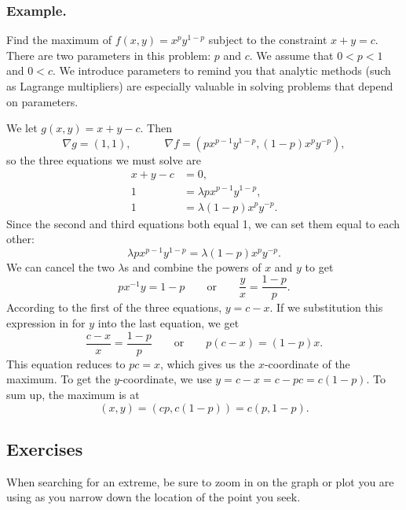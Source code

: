 \subsubsection{Example.}
Find the maximum of $f(x, y) = x^p y^{1-p}$ subject to
the constraint $x + y = c$.  There are two parameters in this problem:
$p$ and $c$.  We assume that $0 < p < 1$ and $0 < c$.  We introduce
parameters to remind you that analytic methods (such as Lagrange
multipliers) are especially valuable in solving problems that depend
on parameters.

We let $g(x, y) = x + y - c$.  Then
       \[
\nabla g = (1, 1), \qquad \quad \nabla f = 
                \left(p x^{p-1} y^{1-p}, (1-p) x^p y^{-p} \right),
\]
so the three equations we must solve are
\begin{align*}
x + y - c &= 0, \\
        1 &= \lambda p x^{p-1} y^{1-p}, \\
        1 &= \lambda (1-p) x^p y^{-p}.
\end{align*}
Since the second and third equations both equal 1, we can set them
equal to each other:
        \[
\lambda p x^{p-1} y^{1-p} = \lambda (1-p) x^p y^{-p}.
\]
We can cancel the two $\lambda$s and combine the powers of $x$ and $y$ to get
        \[
p x^{-1} y = 1 - p \qquad \mbox{or} \qquad 
                \dfrac{y}{x} = \dfrac{1 - p}{p}.
\]
According to the first of the three equations, $y = c - x$.  If we substitution this expression in for $y$ into the last equation, we get
        \[
\dfrac{c - x}{x} = \dfrac{1 - p}{p} \qquad \mbox{or} \qquad 
                p(c - x) = (1 - p) x.
\]
This equation reduces to $pc = x$, which gives us the $x$-coordinate of the maximum.  To get the $y$-coordinate, we use $y = c - x = c - pc = c(1 - p)$.  To sum up, the maximum is at
        \[
(x, y) = (cp, c(1-p)) = c(p, 1-p).
\]

\subsection{Exercises}
\label{subsec:exercises}

When searching for an extreme, be sure to zoom in on the graph or plot
you are using as you narrow down the location of the point you seek.


